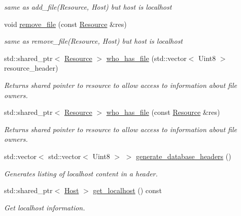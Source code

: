 \begin{DoxyCompactItemize}
\begin{DoxyCompactList}\small\item\em same as add\+\_\+file(\+Resource, Host) but host is localhost \end{DoxyCompactList}\item 
void \hyperlink{classsimpleP2P_1_1ResourceDatabase_a995998d524895ed8227fa045b8b64c01}{remove\+\_\+file} (const \hyperlink{classsimpleP2P_1_1Resource}{Resource} \&res)
\begin{DoxyCompactList}\small\item\em same as remove\+\_\+file(\+Resource, Host) but host is localhost \end{DoxyCompactList}\item 
std\+::shared\+\_\+ptr$<$ \hyperlink{classsimpleP2P_1_1Resource}{Resource} $>$ \hyperlink{classsimpleP2P_1_1ResourceDatabase_a32c5a7b08405cbef80010f8ec1119f58}{who\+\_\+has\+\_\+file} (std\+::vector$<$ Uint8 $>$ resource\+\_\+header)
\begin{DoxyCompactList}\small\item\em Returns shared pointer to resource to allow access to information about file owners. \end{DoxyCompactList}\item 
std\+::shared\+\_\+ptr$<$ \hyperlink{classsimpleP2P_1_1Resource}{Resource} $>$ \hyperlink{classsimpleP2P_1_1ResourceDatabase_a1148b6d172d74970c2208d24aac4db3e}{who\+\_\+has\+\_\+file} (const \hyperlink{classsimpleP2P_1_1Resource}{Resource} \&res)
\begin{DoxyCompactList}\small\item\em Returns shared pointer to resource to allow access to information about file owners. \end{DoxyCompactList}\item 
std\+::vector$<$ std\+::vector$<$ Uint8 $>$ $>$ \hyperlink{classsimpleP2P_1_1ResourceDatabase_ac0bd5de646419fe620f641502a400028}{generate\+\_\+database\+\_\+headers} ()
\begin{DoxyCompactList}\small\item\em Generates listing of localhost content in a header. \end{DoxyCompactList}\item 
std\+::shared\+\_\+ptr$<$ \hyperlink{classsimpleP2P_1_1Host}{Host} $>$ \hyperlink{classsimpleP2P_1_1ResourceDatabase_a4d8c618cbb707f9b29f6315ff1abe6f6}{get\+\_\+localhost} () const
\begin{DoxyCompactList}\small\item\em Get localhost information. \end{DoxyCompactList}\item 

\end{DoxyCompactItemize}

